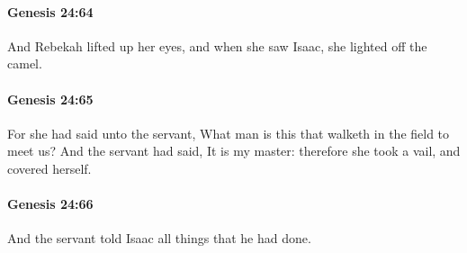 		\paragraph{Genesis 24:64} %
			\label{GENESIS-24-64}

			And Rebekah lifted up her eyes, and when she saw Isaac, she lighted off the camel.


		\paragraph{Genesis 24:65} %
			\label{GENESIS-24-65}

			For she had said unto the servant, What man is this that walketh in the field to meet us?  And the servant had said, It is my master: therefore she took a vail, and covered herself.


		\paragraph{Genesis 24:66} %
			\label{GENESIS-24-66}

			And the servant told Isaac all things that he had done.


